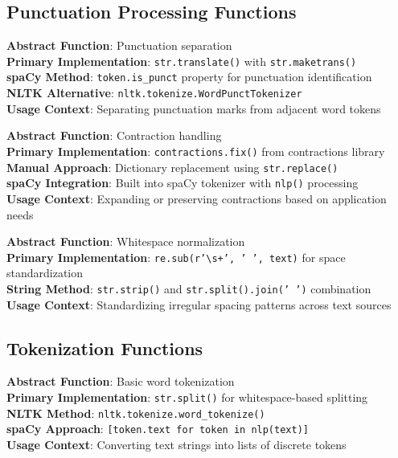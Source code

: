 \documentclass[11pt,a4paper]{article}
\begin{document}
\subsection{Punctuation Processing Functions}

\textbf{Abstract Function}: Punctuation separation \\
\textbf{Primary Implementation}: \texttt{str.translate()} with \texttt{str.maketrans()} \\
\textbf{spaCy Method}: \texttt{token.is\_punct} property for punctuation identification \\
\textbf{NLTK Alternative}: \texttt{nltk.tokenize.WordPunctTokenizer} \\
\textbf{Usage Context}: Separating punctuation marks from adjacent word tokens

\textbf{Abstract Function}: Contraction handling \\
\textbf{Primary Implementation}: \texttt{contractions.fix()} from contractions library \\
\textbf{Manual Approach}: Dictionary replacement using \texttt{str.replace()} \\
\textbf{spaCy Integration}: Built into spaCy tokenizer with \texttt{nlp()} processing \\
\textbf{Usage Context}: Expanding or preserving contractions based on application needs

\textbf{Abstract Function}: Whitespace normalization \\
\textbf{Primary Implementation}: \texttt{re.sub(r'\textbackslash s+', ' ', text)} for space standardization \\
\textbf{String Method}: \texttt{str.strip()} and \texttt{str.split().join(' ')} combination \\
\textbf{Usage Context}: Standardizing irregular spacing patterns across text sources

\subsection{Tokenization Functions}

\textbf{Abstract Function}: Basic word tokenization \\
\textbf{Primary Implementation}: \texttt{str.split()} for whitespace-based splitting \\
\textbf{NLTK Method}: \texttt{nltk.tokenize.word\_tokenize()} \\
\textbf{spaCy Approach}: \texttt{[token.text for token in nlp(text)]} \\
\textbf{Usage Context}: Converting text strings into lists of discrete tokens
\end{document}
